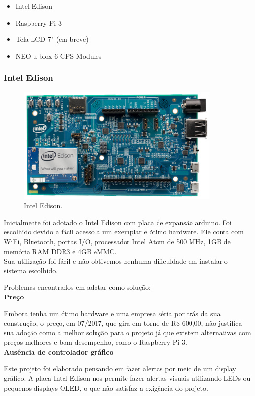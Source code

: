 \documentclass[
	12pt,				%
	oneside,			%
	a4paper,			%
	brazil				%
]{abntex2}
\begin{document}
{\begin{itemize}
\item Intel Edison
\item Raspberry Pi 3
\item Tela LCD 7" (em breve)
\item NEO u-blox 6 GPS Modules
\end{itemize}

\subsubsection{Intel Edison}

\begin{figure}[!h]
\centering
\includegraphics[width=10cm, center]{images/intel-edison-arduino-kit}
\caption{Intel Edison.}
\label{Rotulo}
\end{figure}

Inicialmente foi adotado o Intel Edison com placa de expansão arduino. Foi escolhido devido a fácil acesso a um exemplar e ótimo hardware. Ele conta com WiFi, Bluetooth, portas I/O, processador Intel Atom de 500 MHz, 1GB de memória RAM DDR3 e 4GB eMMC. \\
Sua utilização foi fácil e não obtivemos nenhuma dificuldade em instalar o sistema escolhido.


Problemas encontrados em adotar como solução:
\\

\textbf{Preço}

Embora tenha um ótimo hardware e uma empresa séria por trás da sua construção, o preço, em 07/2017, que gira em torno de R\$ 600,00, não justifica sua adoção como a melhor solução para o projeto já que existem alternativas com preços melhores e bom desempenho, como o Raspberry Pi 3.
\\

\textbf{Ausência de controlador gráfico}

Este projeto foi elaborado pensando em fazer alertas por meio de um display gráfico. A placa Intel Edison nos permite fazer alertas visuais utilizando LEDs ou pequenos displays OLED, o que não satisfaz a exigência do projeto.  
\\

}
\end{document}
